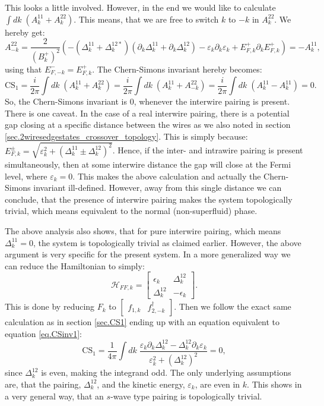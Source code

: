 This looks a little involved. However, in the end we would like to calculate $\int dk\; (A^{11}_k + A^{22}_k )$. This means, that we are free to switch $k$ to $-k$ in $A^{22}_k$. We hereby get: 
\begin{equation}
A^{22}_{-k} = \frac{2}{(B^{+}_k)^2}\left(-\left(\Delta^{11}_k + \Delta^{12*}_k \right) \left(\partial_k\Delta^{11}_k + \partial_k\Delta^{12}_k \right) - \varepsilon_k\partial_k\varepsilon_k + E^{+}_{F,k}\partial_k E^{+}_{F,k}\right) = - A^{11}_k, \nonumber
\end{equation}
using that $E^{-}_{F,-k} = E^{+}_{F,k}$. The Chern-Simons invariant hereby becomes:
\begin{equation}
\text{CS}_1 = \frac{i}{2\pi}\int dk\; \left(A^{11}_k + A^{22}_k\right) = \frac{i}{2\pi}\int dk\; \left(A^{11}_k + A^{22}_{-k}\right) = \frac{i}{2\pi}\int dk\; \left(A^{11}_k - A^{11}_k\right) = 0. 
\end{equation}
So, the Chern-Simons invariant is 0, whenever the interwire pairing is present. There is one caveat. In the case of a real interwire pairing, there is a potential gap closing at a specific distance between the wires as we also noted in section \ref{sec.2wiresedgestates_crossover_topology}. This is simply because: $E^{\pm}_{F,k} = \sqrt{\varepsilon^2_k + (\Delta^{11}_k \pm \Delta^{12}_k)^2}$. Hence, if the inter- and intrawire pairing is present simultaneously, then at some interwire distance the gap will close at the Fermi level, where $\varepsilon_k = 0$. This makes the above calculation and actually the Chern-Simons invariant ill-defined. However, away from this single distance we can conclude, that the presence of interwire pairing makes the system topologically trivial, which means equivalent to the normal (non-superfluid) phase. 

The above analysis also shows, that for pure interwire pairing, which means $\Delta^{11}_k = 0$, the system is topologically trivial as claimed earlier. However, the above argument is very specific for the present system. In a more generalized way we can reduce the Hamiltonian to simply:
\begin{equation}
\mathcal{H}_{FF,k} = \begin{bmatrix}\epsilon_k & \Delta^{12}_k\\ \Delta^{12}_k & -\epsilon_k \end{bmatrix}. \nonumber
\end{equation} 
This is done by reducing $F_k$ to $\begin{bmatrix} f_{1,k} & f^\dagger_{2,-k} \end{bmatrix}$. Then we follow the exact same calculation as in section \ref{sec.CS1} ending up with an equation equivalent to equation \eqref{eq.CSinv1}: 
\begin{equation}
\text{CS}_1 = \frac{1}{4\pi}\int dk \;  \frac{\varepsilon_k\partial_k\Delta^{12}_k - \Delta^{12}_k \partial_k \varepsilon_k}{\varepsilon^2_k + (\Delta^{12}_k)^2} = 0,
\end{equation}
since $\Delta^{12}_k$ is even, making the integrand odd. The only underlying assumptions are, that the pairing, $\Delta^{12}_k$, and the kinetic energy, $\varepsilon_k$, are even in $k$. This shows in a very general way, that an $s$-wave type pairing is topologically trivial. 

